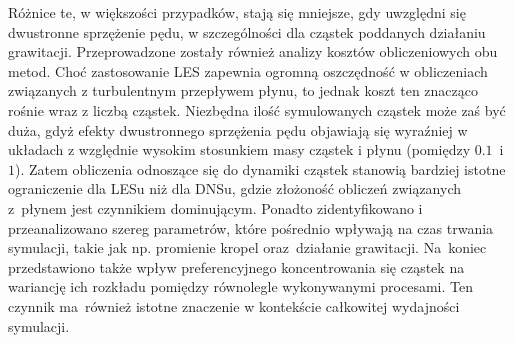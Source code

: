 \documentclass{pracamgren}
\begin{document}
{Różnice te, w większości przypadków, stają się mniejsze, gdy uwzględni się dwustronne sprzężenie pędu, w szczególności dla cząstek poddanych działaniu grawitacji.
\newline \indent
Przeprowadzone zostały również analizy kosztów obliczeniowych obu metod.
Choć zastosowanie LES zapewnia ogromną oszczędność w obliczeniach związanych z turbulentnym przepływem płynu, to jednak koszt ten znacząco rośnie wraz z liczbą cząstek.
Niezbędna ilość symulowanych cząstek może zaś być duża, gdyż efekty dwustronnego sprzężenia pędu objawiają się wyraźniej w układach z względnie wysokim stosunkiem masy cząstek i płynu (pomiędzy $0.1$~i~$1$).
Zatem obliczenia odnoszące się do dynamiki cząstek stanowią bardziej istotne ograniczenie dla LESu niż dla DNSu, gdzie złożoność obliczeń związanych z~płynem jest czynnikiem dominującym.
Ponadto zidentyfikowano i przeanalizowano szereg parametrów, które pośrednio wpływają na czas trwania symulacji, takie jak np. promienie kropel oraz~działanie grawitacji.
Na~koniec przedstawiono także wpływ preferencyjnego koncentrowania się cząstek na wariancję ich rozkładu pomiędzy równolegle wykonywanymi procesami.
Ten czynnik ma~również istotne znaczenie w kontekście całkowitej wydajności symulacji.
}
\end{document}
